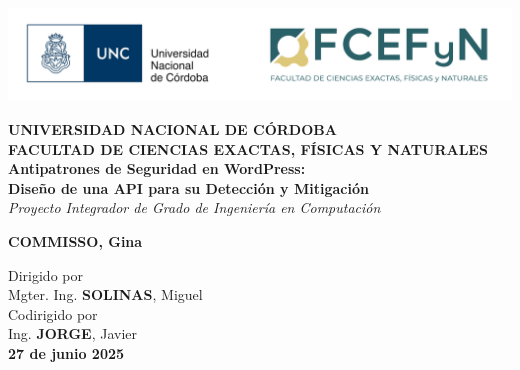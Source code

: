\begin{titlepage}
\begin{center}

\begin{center}
    \includegraphics[height=2.5cm]{Imagenes/logofcefynunc.png}
\end{center}


\vspace{2cm}

\textbf{\large UNIVERSIDAD NACIONAL DE CÓRDOBA} \\[0.3cm]
\textbf{\large FACULTAD DE CIENCIAS EXACTAS, FÍSICAS Y NATURALES} \\[3cm]

\textbf{\huge Antipatrones de Seguridad en WordPress:} \\[0.3cm]
\textbf{\huge Diseño de una API para su Detección y Mitigación} \\[0.8cm]

\textit{\large Proyecto Integrador de Grado de Ingeniería en Computación} \\[2cm]

\begin{minipage}{1\textwidth}
    \centering
    \textbf{\Large COMMISSO, Gina} 
\end{minipage}

\vspace{2cm}

Dirigido por \\
Mgter. Ing. \textbf{SOLINAS}, Miguel \\[0.5cm]

Codirigido por \\
Ing. \textbf{JORGE}, Javier \\[3cm]

\textbf{27 de junio 2025}

\end{center}
\end{titlepage}

